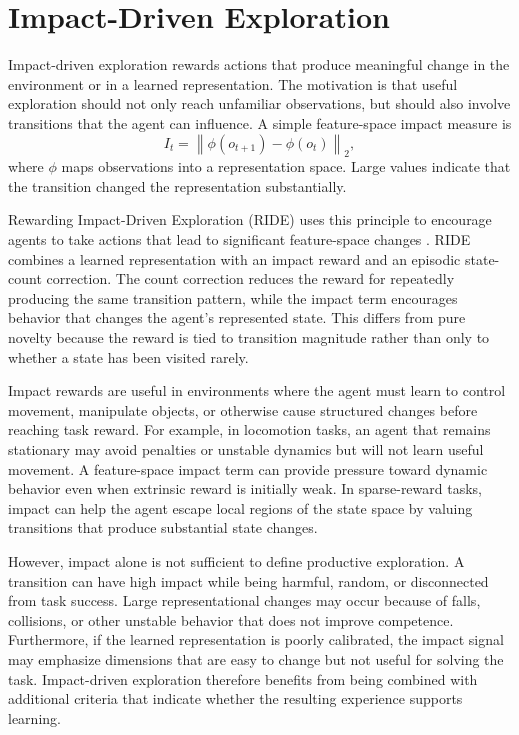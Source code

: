 \section{Impact-Driven Exploration}
\label{sec:impact_driven_exploration}

Impact-driven exploration rewards actions that produce meaningful change in the environment or in a learned representation.
The motivation is that useful exploration should not only reach unfamiliar observations, but should also involve transitions that the agent can influence.
A simple feature-space impact measure is
\begin{equation}
    I_t = \left\lVert \phi(o_{t+1})-\phi(o_t)\right\rVert_2,
\end{equation}
where $\phi$ maps observations into a representation space.
Large values indicate that the transition changed the representation substantially.

Rewarding Impact-Driven Exploration (RIDE) uses this principle to encourage agents to take actions that lead to significant feature-space changes \parencite{raileanu-2020}.
RIDE combines a learned representation with an impact reward and an episodic state-count correction.
The count correction reduces the reward for repeatedly producing the same transition pattern, while the impact term encourages behavior that changes the agent's represented state.
This differs from pure novelty because the reward is tied to transition magnitude rather than only to whether a state has been visited rarely.

Impact rewards are useful in environments where the agent must learn to control movement, manipulate objects, or otherwise cause structured changes before reaching task reward.
For example, in locomotion tasks, an agent that remains stationary may avoid penalties or unstable dynamics but will not learn useful movement.
A feature-space impact term can provide pressure toward dynamic behavior even when extrinsic reward is initially weak.
In sparse-reward tasks, impact can help the agent escape local regions of the state space by valuing transitions that produce substantial state changes.

However, impact alone is not sufficient to define productive exploration.
A transition can have high impact while being harmful, random, or disconnected from task success.
Large representational changes may occur because of falls, collisions, or other unstable behavior that does not improve competence.
Furthermore, if the learned representation is poorly calibrated, the impact signal may emphasize dimensions that are easy to change but not useful for solving the task.
Impact-driven exploration therefore benefits from being combined with additional criteria that indicate whether the resulting experience supports learning.


